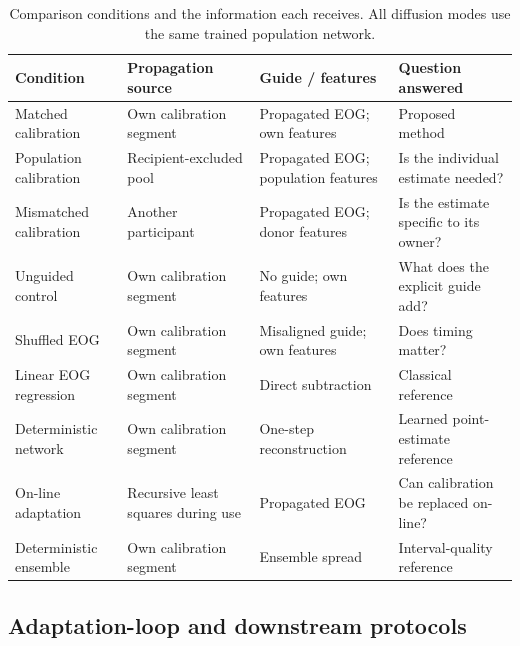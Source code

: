 \begin{table}[t]
\caption{Comparison conditions and the information each receives. All diffusion modes use the same trained population network.}
\label{tab:variants}
\centering
\small
\begin{tabularx}{\textwidth}{@{}p{}Yp{.20\textwidth}p{.24\textwidth}@{}}
\toprule
Condition & Propagation source & Guide / features & Question answered \\
\midrule
Matched calibration & Own calibration segment & Propagated EOG; own features & Proposed method \\
Population calibration & Recipient-excluded pool & Propagated EOG; population features & Is the individual estimate needed? \\
Mismatched calibration & Another participant & Propagated EOG; donor features & Is the estimate specific to its owner? \\
Unguided control & Own calibration segment & No guide; own features & What does the explicit guide add? \\
Shuffled EOG & Own calibration segment & Misaligned guide; own features & Does timing matter? \\
Linear EOG regression & Own calibration segment & Direct subtraction & Classical reference \\
Deterministic network & Own calibration segment & One-step reconstruction & Learned point-estimate reference \\
On-line adaptation & Recursive least squares during use & Propagated EOG & Can calibration be replaced on-line? \\
Deterministic ensemble & Own calibration segment & Ensemble spread & Interval-quality reference \\
\bottomrule
\end{tabularx}
\end{table}

\subsection{Adaptation-loop and downstream protocols}
\label{sec:exp-loop}

